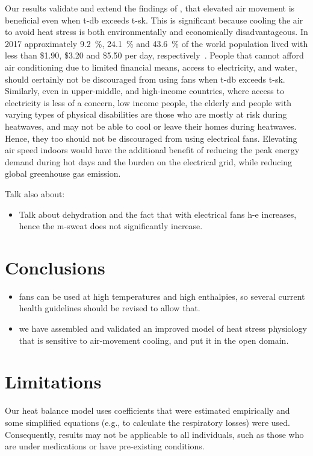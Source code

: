Our results validate and extend the findings of , that elevated air movement is beneficial even when \ac{t-db} exceeds \acf{t-sk}.
This is significant because cooling the air to avoid heat stress is both environmentally and economically disadvantageous.
In 2017 approximately 9.2~\%, 24.1~\% and 43.6~\% of the world population lived with less than \$1.90, \$3.20 and \$5.50 per day, respectively~\cite{PovertyO1:online}.
People that cannot afford air conditioning due to limited financial means, access to electricity, and water, should certainly not be discouraged from using fans when \ac{t-db} exceeds \ac{t-sk}.
Similarly, even in upper-middle, and high-income countries, where access to electricity is less of a concern, low income people, the elderly and people with varying types of physical disabilities are those who are mostly at risk during heatwaves, and may not be able to cool or leave their homes during heatwaves.
Hence, they too should not be discouraged from using electrical fans.
Elevating air speed indoors would have the additional benefit of reducing the peak energy demand during hot days and the burden on the electrical grid, while reducing global greenhouse gas emission.

Talk also about:
\begin{itemize}
    \item Talk about dehydration and the fact that with electrical fans \ac{h-e} increases, hence the \ac{m-sweat} does not significantly increase. %
\end{itemize}

\section{Conclusions}\label{sec:conclusions}
\begin{itemize}
    \item fans can be used at high temperatures and high enthalpies, so several current health guidelines should be revised to allow that.
    \item we have assembled and validated an improved model of heat stress physiology that is sensitive to air-movement cooling, and put it in the open domain.
\end{itemize}


\section*{Limitations}
Our heat balance model uses coefficients that were estimated empirically and some simplified equations (e.g., to calculate the respiratory losses) were used.
Consequently, results may not be applicable to all individuals, such as those who are under medications or have pre-existing conditions.
